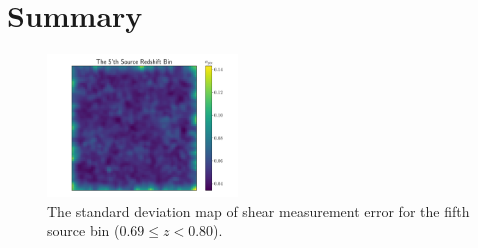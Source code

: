 \documentclass[twocolumn]{aastex62}
\begin{document}
\section{Summary}
\label{sec:Sum}

\begin{figure}[!ht]
 \centering
 \includegraphics[width=0.45\textwidth]{noise_std_map_pix.pdf}
 \caption{The standard deviation map of shear measurement error for the fifth source bin ($0.69 \leq z < 0.80 $).}
\end{figure}




\appendix
\end{document}
